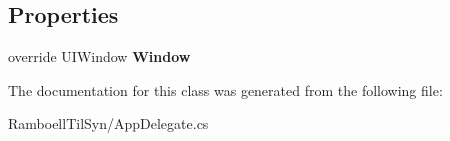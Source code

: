 \subsection*{Properties}
\begin{DoxyCompactItemize}
\item 
\mbox{\label{class_ramboell_1_1i_o_s_1_1_app_delegate_a82639ab080401d415e86c1e4f54812ee}} 
override U\+I\+Window {\bfseries Window}
\end{DoxyCompactItemize}


The documentation for this class was generated from the following file\+:\begin{DoxyCompactItemize}
\item 
Ramboell\+Til\+Syn/App\+Delegate.\+cs\end{DoxyCompactItemize}
